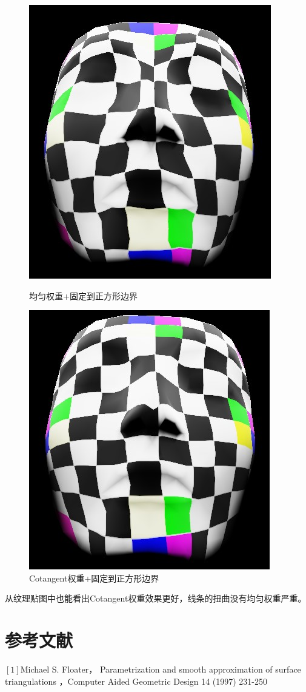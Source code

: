 \documentclass{article}
\begin{document}
	\begin{figure}[htbp]
		\centering
		\begin{minipage}{0.49\linewidth}
			\centering
			\includegraphics[width=0.6\linewidth]{UStex.JPG}
			\caption{均匀权重+固定到正方形边界}
		\end{minipage}
		\begin{minipage}{0.49\linewidth}
			\centering
			\includegraphics[width=0.7\linewidth]{CStex.JPG}
			\caption{Cotangent权重+固定到正方形边界}
		\end{minipage}
	\end{figure}
	从纹理贴图中也能看出Cotangent权重效果更好，线条的扭曲没有均匀权重严重。
\section{参考文献}
  $[1]$Michael S. Floater， Parametrization and smooth approximation of surface 
  triangulations ，Computer Aided Geometric Design 14 (1997) 231-250 
\end{document}
